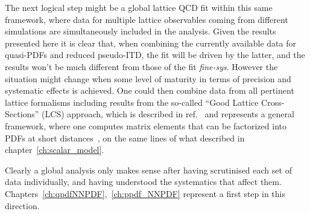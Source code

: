 %
The next logical step might be a global lattice QCD fit within this same framework, where data for multiple lattice observables 
coming from different simulations are simultaneously included in the analysis.
Given the results presented here it is clear that, when combining the currently available
data for quasi-PDFs and reduced pseudo-ITD, the fit will be driven by the latter, 
and the results won't be much different from those of the fit \textit{fine-sys}.
However the situation might change when 
some level of maturity in terms of precision and systematic effects is achieved.
One could then combine data from all pertinent lattice formalisms 
including results from the so-called “Good Lattice Cross-Sections” (LCS) approach, which is described in ref.~\cite{Ma:2017pxb}
and represents a general framework, where one computes matrix elements that can be factorized into PDFs
at short distances~\cite{Bali:2017gfr,Bali:2018spj,Sufian:2019bol,Bali:2019ecy, Sufian:2020vzb}, on the same 
lines of what described in chapter~\ref{ch:scalar_model}.

Clearly a global analysis only makes sense after having scrutinised each set of data individually,
and having understood the systematics that affect them. Chapters~\ref{ch:qpdfNNPDF},~\ref{ch:ppdf_NNPDF} represent a 
first step in this direction.